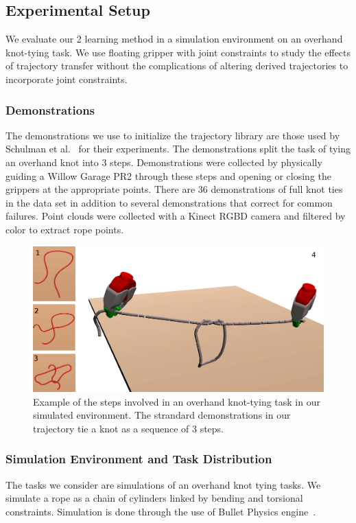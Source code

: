 \subsection{Experimental Setup}
We evaluate our 2 learning method in a simulation environment on an overhand knot-tying task.
We use floating gripper with joint constraints to study the effects of trajectory transfer
without the complications of altering derived trajectories to incorporate joint constraints.

\subsubsection{Demonstrations}
The demonstrations we use to initialize the trajectory library are those used by
Schulman et al.~\cite{Schulmanetal_ISRR2013} for their experiments. The demonstrations
split the task of tying an overhand knot into 3 steps. Demonstrations were collected
by physically guiding a Willow Garage PR2 through these steps and opening or closing 
the grippers at the appropriate points. There are 36 demonstrations of full knot ties
in the data set in addition to several demonstrations that correct for common failures.
Point clouds were collected with a Kinect RGBD camera and filtered by color to extract
rope points. 

\begin{figure}
  \includegraphics[width=\linewidth]{figs/cov.png}
  \caption{Example of the steps involved in an overhand knot-tying task in our simulated
           environment. The strandard demonstrations in our trajectory tie a knot as a 
           sequence of 3 steps.}
  \label{fig:knot_steps}
\end{figure}


\subsubsection{Simulation Environment and Task Distribution} 
The tasks we consider are simulations of an overhand knot tying tasks. 
We simulate a rope as a chain of cylinders linked by bending and torsional constraints.
Simulation is done through the use of Bullet Physics engine~\cite{Bullet_Physics}.

